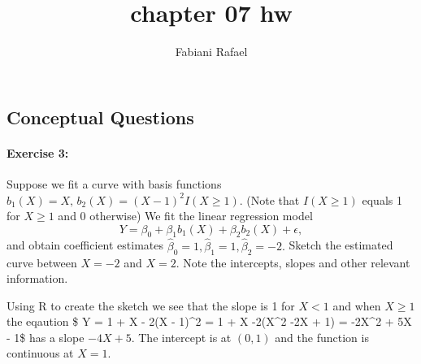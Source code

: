 \documentclass[
]{article}
\title{chapter 07 hw}
\author{Fabiani Rafael}
\date{}
\begin{document}
\maketitle

\thispagestyle{fancy}

\subsection{Conceptual Questions}\label{conceptual-questions}

\paragraph{Exercise 3:}\label{exercise-3}

Suppose we fit a curve with basis functions
\(b_1(X) = X , \, b_2(X) = (X -1)^2I(X \geq 1)\). (Note that
\(I(X \geq 1)\) equals 1 for \(X \geq 1\) and 0 otherwise) We fit the
linear regression model
\[ Y = \beta_0 + \beta_1b_1(X) + \beta_2b_2(X) + \epsilon ,\] and obtain
coefficient estimates
\(\hat\beta_0 = 1, \hat\beta_1 =1, \hat\beta_2 = -2.\) Sketch the
estimated curve between \(X = -2\) and \(X = 2.\) Note the intercepts,
slopes and other relevant information.

Using R to create the sketch we see that the slope is 1 for \(X < 1\)
and when \(X \geq 1\) the eqaution \$ Y = 1 + X - 2(X - 1)\^{}2 = 1 + X
-2(X\^{}2 -2X + 1) = -2X\^{}2 + 5X - 1\$ has a slope \(-4X + 5\). The
intercept is at \((0, 1)\) and the function is continuous at \(X = 1\).
\end{document}
